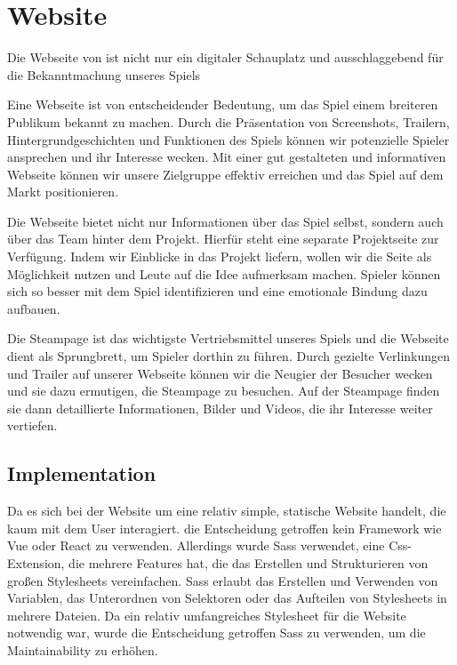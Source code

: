 
\section{Website}\label{sec:website}
\renewcommand{\kapitelautor}{Autor: Nils Hubmann}

%
Die Webseite von \ff ist nicht nur ein digitaler Schauplatz und ausschlaggebend für die Bekanntmachung unseres Spiels

Eine Webseite ist von entscheidender Bedeutung, um das Spiel einem breiteren Publikum bekannt zu machen.
Durch die Präsentation von Screenshots, Trailern, Hintergrundgeschichten und Funktionen des Spiels können wir potenzielle Spieler ansprechen und ihr Interesse wecken.
Mit einer gut gestalteten und informativen Webseite können wir unsere Zielgruppe effektiv erreichen und das Spiel auf dem Markt positionieren.

Die Webseite bietet nicht nur Informationen über das Spiel selbst, sondern auch über das Team hinter dem Projekt.
Hierfür steht eine separate Projektseite zur Verfügung.
Indem wir Einblicke in das Projekt liefern, wollen wir die Seite als Möglichkeit nutzen und Leute auf die Idee aufmerksam machen.
Spieler können sich so besser mit dem Spiel identifizieren und eine emotionale Bindung dazu aufbauen.

Die Steampage ist das wichtigste Vertriebsmittel unseres Spiels und die Webseite dient als Sprungbrett, um Spieler dorthin zu führen.
Durch gezielte Verlinkungen und Trailer auf unserer Webseite
können wir die Neugier der Besucher wecken und sie dazu ermutigen, die Steampage zu besuchen.
Auf der Steampage finden sie dann detaillierte Informationen, Bilder und Videos, die ihr Interesse weiter vertiefen.
%
\pagebreak
\subsection{Implementation}
\renewcommand{\kapitelautor}{Autor: Marvin Kurka}

Da es sich bei der Website um eine relativ simple, statische Website handelt, die kaum mit dem User interagiert.
die Entscheidung getroffen kein Framework wie \zB Vue oder React zu verwenden.
Allerdings wurde Sass verwendet, eine Css-Extension, die mehrere Features hat, die das Erstellen und Strukturieren
von großen Stylesheets vereinfachen.
Sass erlaubt \zB das Erstellen und Verwenden von Variablen, das Unterordnen von Selektoren oder das Aufteilen von
Stylesheets in mehrere Dateien.
Da ein relativ umfangreiches Stylesheet für die Website notwendig war, wurde die Entscheidung getroffen Sass zu
verwenden, um die Maintainability zu erhöhen.

